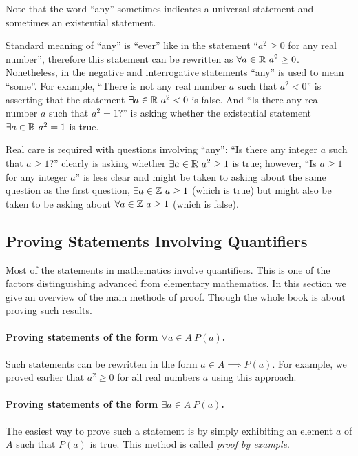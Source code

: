 \begin{warning}
  Note that the word ``any'' sometimes indicates a universal statement and
  sometimes an existential statement.

  Standard meaning of ``any'' is ``ever'' like in the statement ``$a^2 \ge 0$
  for any real number'', therefore this statement can be rewritten as
  $\forall a \in \mathbb{R} \ a^2 \ge 0$. Nonetheless, in the negative and interrogative
  statements ``any'' is used to mean ``some''. For example, ``There is not any
  real number $a$ such that $a^2 < 0$'' is asserting that the statement
  $\exists a \in \mathbb{R} \ a^2 < 0$ is false. And ``Is there any real number $a$ such
  that $a^2 = 1$?'' is asking whether the existential statement
  $\exists a \in \mathbb{R} \ a^2 = 1$ is true.

  Real care is required with questions involving ``any'': ``Is there any
  integer $a$ such that $a \ge 1$?'' clearly is asking whether $\exists a \in
  \mathbb{R} \ a^2 \ge 1$ is true; however, ``Is $a \ge 1$ for any integer $a$'' is less
  clear and might be taken to asking about the same question as the first
  question, $\exists a \in \mathbb{Z} \ a \ge 1$ (which is true) but might also be
  taken to be asking about $\forall a \in \mathbb{Z} \ a \ge 1$ (which is false).
\end{warning}

\subsection{Proving Statements Involving Quantifiers}
Most of the statements in mathematics involve quantifiers. This is one of the
factors distinguishing advanced from elementary mathematics. In this section we
give an overview of the main methods of proof. Though the whole book is about
proving such results.

\paragraph{Proving statements of the form $\forall a \in A \ P(a)$.}
Such statements can be rewritten in the form $a \in A \implies P(a)$. For
example, we proved earlier that $a^2 \ge 0$ for all real numbers $a$ using this
approach.

\paragraph{Proving statements of the form $\exists a \in A \ P(a)$.}
The easiest way to prove such a statement is by simply exhibiting an element $a$
of $A$ such that $P(a)$ is true. This method is called \textit{proof by
example}.

